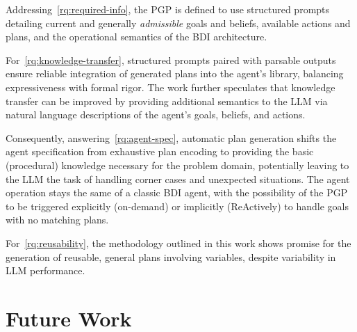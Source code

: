 \documentclass[12pt,a4paper,openright,twoside]{book}
\begin{document}
Addressing~\ref{rq:required-info}, the \ac{PGP} is defined to use structured prompts detailing current and generally \emph{admissible} goals and beliefs, available actions and plans, and the operational semantics of the \ac{BDI} architecture.


For~\ref{rq:knowledge-transfer}, structured prompts paired with parsable outputs ensure reliable integration of generated plans into the agent's library, balancing expressiveness with formal rigor.
%
The work further speculates that knowledge transfer can be improved by providing additional semantics to the \ac{LLM} via natural language descriptions of the agent's goals, beliefs, and actions.

Consequently, answering~\ref{rq:agent-spec}, automatic plan generation shifts the agent specification from exhaustive plan encoding to providing the basic (procedural) knowledge necessary for the problem domain, potentially leaving to the \ac{LLM} the task of handling corner cases and unexpected situations.
%
The agent operation stays the same of a classic \ac{BDI} agent, with the possibility of the \ac{PGP} to be triggered explicitly (on-demand) or implicitly (\ac{ReAct}ively) to handle goals with no matching plans.

For~\ref{rq:reusability}, the methodology outlined in this work shows promise for the generation of reusable, general plans involving variables, despite variability in \ac{LLM} performance.

\section{Future Work}

\end{document}
